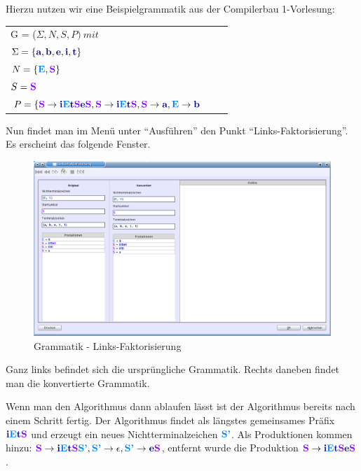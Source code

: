 Hierzu nutzen wir eine Beispielgrammatik aus der Compilerbau 1-Vorlesung:

\begin{tabular}{lcr}
G = ($\Sigma, N, S, P )\ mit $\\
$\Sigma = \{\TerminalSymbol{a}, \TerminalSymbol{b}, \TerminalSymbol{e},
\TerminalSymbol{i},\TerminalSymbol{t}\}$\\ $N =
\{\NonterminalSymbol{E}, \StartSymbol{S}\}$\\ $S=\StartSymbol{S}$\\
$P = \{\StartSymbol{S} \to \TerminalSymbol{i}\NonterminalSymbol{E}\TerminalSymbol{t}\StartSymbol{S}\TerminalSymbol{e}\StartSymbol{S},\StartSymbol{S} \to \TerminalSymbol{i}\NonterminalSymbol{E}\TerminalSymbol{t}\StartSymbol{S}, \StartSymbol{S} \to \TerminalSymbol{a}, \NonterminalSymbol{E} \to \TerminalSymbol{b}$\\
\end{tabular}

Nun findet man im Menü unter "`Ausführen"' den Punkt "`Links-Faktorisierung"'. Es erscheint das folgende Fenster.

\begin{figure}[h]
\begin{center}
\includegraphics[width=12cm]{../images/left_factoring.png}
\caption{Grammatik - Links-Faktorisierung}
\end{center}
\end{figure}

Ganz links befindet sich die ursprüngliche Grammatik. Rechts daneben findet man die konvertierte Grammatik.

Wenn man den Algorithmus dann ablaufen lässt ist der Algorithmus bereits nach einem Schritt fertig. Der Algorithmus findet als längstes gemeinsames Präfix $\TerminalSymbol{i}\NonterminalSymbol{E}\TerminalSymbol{t}\StartSymbol{S}$ und erzeugt ein neues Nichtterminalzeichen $\NonterminalSymbol{S'}$. Als Produktionen kommen hinzu: $\StartSymbol{S} \to \TerminalSymbol{i}\NonterminalSymbol{E}\TerminalSymbol{t}\StartSymbol{S}\NonterminalSymbol{S'}, \NonterminalSymbol{S'} \to \epsilon, \NonterminalSymbol{S'} \to \TerminalSymbol{e}\StartSymbol{S}$, entfernt wurde die Produktion $\StartSymbol{S} \to \TerminalSymbol{i}\NonterminalSymbol{E}\TerminalSymbol{t}\StartSymbol{S}\TerminalSymbol{e}\StartSymbol{S}$.

